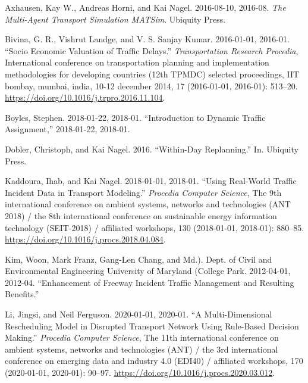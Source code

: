 \documentclass[
  letterpaper,
  DIV=11,
  numbers=noendperiod]{scrreprt}
\newlength{\cslhangindent}
\newlength{\cslentryspacingunit} %
\newenvironment{CSLReferences}[2] %
 {%
  \setlength{\parindent}{0pt}
  \ifodd #1
  \let\oldpar\par
  \def\par{\hangindent=\cslhangindent\oldpar}
  \fi
  \setlength{\parskip}{#2\cslentryspacingunit}
 }%
 {}
\begin{document}

\hypertarget{refs}{}
\begin{CSLReferences}{1}{0}
\leavevmode{}%
Axhausen, Kay W., Andreas Horni, and Kai Nagel. 2016-08-10, 2016-08.
\emph{The Multi-Agent Transport Simulation {MATSim}}. {Ubiquity Press}.

\leavevmode{}%
Bivina, G. R., Vishrut Landge, and V. S. Sanjay Kumar. 2016-01-01,
2016-01. {``Socio Economic Valuation of Traffic Delays.''}
\emph{Transportation Research Procedia}, International conference on
transportation planning and implementation methodologies for developing
countries (12th {TPMDC}) selected proceedings, {IIT} bombay, mumbai,
india, 10-12 december 2014, 17 (2016-01-01, 2016-01): 513--20.
\url{https://doi.org/10.1016/j.trpro.2016.11.104}.

\leavevmode{}%
Boyles, Stephen. 2018-01-22, 2018-01. {``Introduction to Dynamic Traffic
Assignment,''} 2018-01-22, 2018-01.

\leavevmode{}%
Dobler, Christoph, and Kai Nagel. 2016. {``Within-Day Replanning.''} In.
{Ubiquity Press}.

\leavevmode{}%
Kaddoura, Ihab, and Kai Nagel. 2018-01-01, 2018-01. {``Using Real-World
Traffic Incident Data in Transport Modeling.''} \emph{Procedia Computer
Science}, The 9th international conference on ambient systems, networks
and technologies ({ANT} 2018) / the 8th international conference on
sustainable energy information technology ({SEIT-2018}) / affiliated
workshops, 130 (2018-01-01, 2018-01): 880--85.
\url{https://doi.org/10.1016/j.procs.2018.04.084}.

\leavevmode{}%
Kim, Woon, Mark Franz, Gang-Len Chang, and Md.). Dept. of Civil and
Environmental Engineering University of Maryland (College Park.
2012-04-01, 2012-04. {``Enhancement of Freeway Incident Traffic
Management and Resulting Benefits.''}

\leavevmode{}%
Li, Jingsi, and Neil Ferguson. 2020-01-01, 2020-01. {``A
Multi-Dimensional Rescheduling Model in Disrupted Transport Network
Using Rule-Based Decision Making.''} \emph{Procedia Computer Science},
The 11th international conference on ambient systems, networks and
technologies ({ANT}) / the 3rd international conference on emerging data
and industry 4.0 ({EDI40}) / affiliated workshops, 170 (2020-01-01,
2020-01): 90--97. \url{https://doi.org/10.1016/j.procs.2020.03.012}.


\end{CSLReferences}
\end{document}
